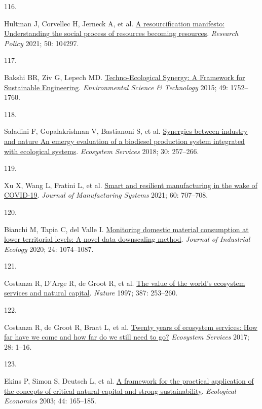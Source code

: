 \documentclass[
  12pt,
  a4paperpaper,
  onecolumn]{article}
\newlength{\cslhangindent}
\newlength{\csllabelwidth}
\newlength{\cslentryspacingunit} %
\newenvironment{CSLReferences}[2] %
 {%
  \setlength{\parindent}{0pt}
  \ifodd #1
  \let\oldpar\par
  \def\par{\hangindent=\cslhangindent\oldpar}
  \fi
  \setlength{\parskip}{#2\cslentryspacingunit}
 }%
 {}
\newcommand{\CSLLeftMargin}[1]{\parbox[t]{\csllabelwidth}{#1}}
\newcommand{\CSLRightInline}[1]{\parbox[t]{\linewidth - \csllabelwidth}{#1}\break}
\begin{document}
\begin{CSLReferences}{0}{0}
\leavevmode{}%
\CSLLeftMargin{116. }%
\CSLRightInline{Hultman J, Corvellec H, Jerneck A, et al.
\href{https://doi.org/10.1016/j.respol.2021.104297}{A resourcification
manifesto: {Understanding} the social process of resources becoming
resources}. \emph{Research Policy} 2021; 50: 104297.}

\leavevmode{}%
\CSLLeftMargin{117. }%
\CSLRightInline{Bakshi BR, Ziv G, Lepech MD.
\href{https://doi.org/10.1021/es5041442}{Techno-{Ecological Synergy}: {A
Framework} for {Sustainable Engineering}}. \emph{Environmental Science
\& Technology} 2015; 49: 1752--1760.}

\leavevmode{}%
\CSLLeftMargin{118. }%
\CSLRightInline{Saladini F, Gopalakrishnan V, Bastianoni S, et al.
\href{https://doi.org/10.1016/j.ecoser.2018.02.004}{Synergies between
industry and nature \textendash{} {An} emergy evaluation of a biodiesel
production system integrated with ecological systems}. \emph{Ecosystem
Services} 2018; 30: 257--266.}

\leavevmode{}%
\CSLLeftMargin{119. }%
\CSLRightInline{Xu X, Wang L, Fratini L, et al.
\href{https://doi.org/10.1016/j.jmsy.2021.07.025}{Smart and resilient
manufacturing in the wake of {COVID-19}}. \emph{Journal of Manufacturing
Systems} 2021; 60: 707--708.}

\leavevmode{}%
\CSLLeftMargin{120. }%
\CSLRightInline{Bianchi M, Tapia C, del Valle I.
\href{https://doi.org/10.1111/jiec.13000}{Monitoring domestic material
consumption at lower territorial levels: {A} novel data downscaling
method}. \emph{Journal of Industrial Ecology} 2020; 24: 1074--1087.}

\leavevmode{}%
\CSLLeftMargin{121. }%
\CSLRightInline{Costanza R, D'Arge R, de Groot R, et al.
\href{https://doi.org/10.1038/387253a0}{The value of the world's
ecosystem services and natural capital}. \emph{Nature} 1997; 387:
253--260.}

\leavevmode{}%
\CSLLeftMargin{122. }%
\CSLRightInline{Costanza R, de Groot R, Braat L, et al.
\href{https://doi.org/10.1016/j.ecoser.2017.09.008}{Twenty years of
ecosystem services: {How} far have we come and how far do we still need
to go?} \emph{Ecosystem Services} 2017; 28: 1--16.}

\leavevmode{}%
\CSLLeftMargin{123. }%
\CSLRightInline{Ekins P, Simon S, Deutsch L, et al.
\href{https://doi.org/10.1016/S0921-8009(02)00272-0}{A framework for the
practical application of the concepts of critical natural capital and
strong sustainability}. \emph{Ecological Economics} 2003; 44: 165--185.}


\end{CSLReferences}
\end{document}
